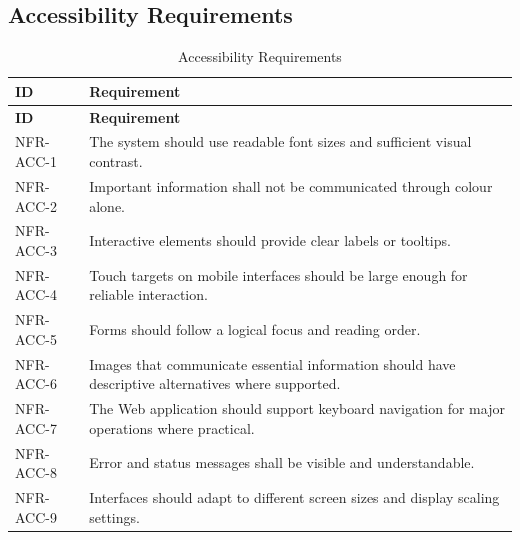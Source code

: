 \subsection{Accessibility Requirements}
\begin{longtable}{@{}p{2.6cm}p{10.8cm}@{}}
\caption{Accessibility Requirements} \label{tab:nfr-acc} \\
\toprule \textbf{ID} & \textbf{Requirement} \\ \midrule
\endfirsthead
\toprule \textbf{ID} & \textbf{Requirement} \\ \midrule
\endhead
NFR-ACC-1 & The system should use readable font sizes and sufficient visual contrast. \\
NFR-ACC-2 & Important information shall not be communicated through colour alone. \\
NFR-ACC-3 & Interactive elements should provide clear labels or tooltips. \\
NFR-ACC-4 & Touch targets on mobile interfaces should be large enough for reliable interaction. \\
NFR-ACC-5 & Forms should follow a logical focus and reading order. \\
NFR-ACC-6 & Images that communicate essential information should have descriptive alternatives where supported. \\
NFR-ACC-7 & The Web application should support keyboard navigation for major operations where practical. \\
NFR-ACC-8 & Error and status messages shall be visible and understandable. \\
NFR-ACC-9 & Interfaces should adapt to different screen sizes and display scaling settings. \\
\bottomrule
\end{longtable}

